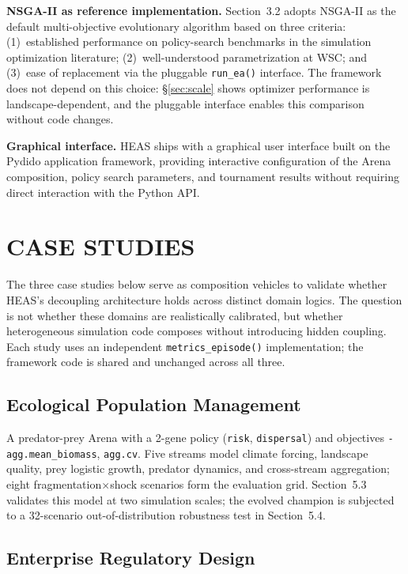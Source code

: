\documentclass{wscpaperproc}
\begin{document}
\textbf{NSGA-II as reference implementation.} Section~3.2 adopts NSGA-II as the
default multi-objective evolutionary algorithm based on three criteria:
(1)~established performance on policy-search benchmarks in the simulation
optimization literature; (2)~well-understood parametrization at WSC; and
(3)~ease of replacement via the pluggable \texttt{run\_ea()} interface. The
framework does not depend on this choice: \S\ref{sec:scale} shows optimizer performance is landscape-dependent, and the pluggable interface enables this comparison without code changes.

\textbf{Graphical interface.} HEAS ships with a graphical user interface
built on the Pydido application framework, providing interactive configuration
of the Arena composition, policy search parameters, and tournament results
without requiring direct interaction with the Python API.

\section{CASE STUDIES}

The three case studies below serve as composition vehicles to validate whether HEAS's decoupling architecture holds across distinct domain logics. The question is not whether these domains are realistically calibrated, but whether heterogeneous simulation code composes without introducing hidden coupling. Each study uses an independent \texttt{metrics\_episode()} implementation; the framework code is shared and unchanged across all three.

\subsection{Ecological Population Management}

A predator-prey Arena with a 2-gene policy (\texttt{risk},
\texttt{dispersal}) and objectives \texttt{-agg.mean\_biomass},
\texttt{agg.cv}. Five streams model climate forcing, landscape quality, prey
logistic growth, predator dynamics, and cross-stream aggregation; eight
fragmentation$\times$shock scenarios form the evaluation grid.
Section~5.3 validates this model at two simulation scales; the evolved champion
is subjected to a 32-scenario out-of-distribution robustness test in
Section~5.4.

\subsection{Enterprise Regulatory Design}
\end{document}
